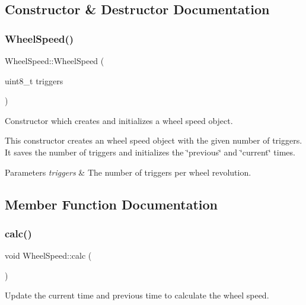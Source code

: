 \subsection{Constructor \& Destructor Documentation}
\mbox{\label{class_wheel_speed_ab7de12fcc47b53a5b046905f1efdf4cf}} 
\subsubsection{\texorpdfstring{Wheel\+Speed()}{WheelSpeed()}}
{\footnotesize\ttfamily Wheel\+Speed\+::\+Wheel\+Speed (\begin{DoxyParamCaption}\item[{uint8\+\_\+t}]{triggers }\end{DoxyParamCaption})}



Constructor which creates and initializes a wheel speed object. 

This constructor creates an wheel speed object with the given number of triggers. It saves the number of triggers and initializes the \char`\"{}previous\char`\"{} and \char`\"{}current\char`\"{} times. 
\begin{DoxyParams}{Parameters}
{\em triggers} & The number of triggers per wheel revolution. \\
\hline
\end{DoxyParams}


\subsection{Member Function Documentation}
\mbox{\label{class_wheel_speed_acb8fa757d8e929af83da7c5842315118}} 
\subsubsection{\texorpdfstring{calc()}{calc()}}
{\footnotesize\ttfamily void Wheel\+Speed\+::calc (\begin{DoxyParamCaption}{ }\end{DoxyParamCaption})}



Update the current time and previous time to calculate the wheel speed. 

